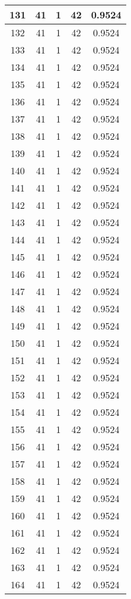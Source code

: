 \documentclass[letterpaper, 12pt]{article}
\begin{document}
\begin{longtable}{|c|c|c|c|c|}
\hline
131 & 41 & 1 & 42 & 0.9524 \\
\hline
132 & 41 & 1 & 42 & 0.9524 \\
\hline
133 & 41 & 1 & 42 & 0.9524 \\
\hline
134 & 41 & 1 & 42 & 0.9524 \\
\hline
135 & 41 & 1 & 42 & 0.9524 \\
\hline
136 & 41 & 1 & 42 & 0.9524 \\
\hline
137 & 41 & 1 & 42 & 0.9524 \\
\hline
138 & 41 & 1 & 42 & 0.9524 \\
\hline
139 & 41 & 1 & 42 & 0.9524 \\
\hline
140 & 41 & 1 & 42 & 0.9524 \\
\hline
141 & 41 & 1 & 42 & 0.9524 \\
\hline
142 & 41 & 1 & 42 & 0.9524 \\
\hline
143 & 41 & 1 & 42 & 0.9524 \\
\hline
144 & 41 & 1 & 42 & 0.9524 \\
\hline
145 & 41 & 1 & 42 & 0.9524 \\
\hline
146 & 41 & 1 & 42 & 0.9524 \\
\hline
147 & 41 & 1 & 42 & 0.9524 \\
\hline
148 & 41 & 1 & 42 & 0.9524 \\
\hline
149 & 41 & 1 & 42 & 0.9524 \\
\hline
150 & 41 & 1 & 42 & 0.9524 \\
\hline
151 & 41 & 1 & 42 & 0.9524 \\
\hline
152 & 41 & 1 & 42 & 0.9524 \\
\hline
153 & 41 & 1 & 42 & 0.9524 \\
\hline
154 & 41 & 1 & 42 & 0.9524 \\
\hline
155 & 41 & 1 & 42 & 0.9524 \\
\hline
156 & 41 & 1 & 42 & 0.9524 \\
\hline
157 & 41 & 1 & 42 & 0.9524 \\
\hline
158 & 41 & 1 & 42 & 0.9524 \\
\hline
159 & 41 & 1 & 42 & 0.9524 \\
\hline
160 & 41 & 1 & 42 & 0.9524 \\
\hline
161 & 41 & 1 & 42 & 0.9524 \\
\hline
162 & 41 & 1 & 42 & 0.9524 \\
\hline
163 & 41 & 1 & 42 & 0.9524 \\
\hline
164 & 41 & 1 & 42 & 0.9524 \\

\end{longtable}
\end{document}
